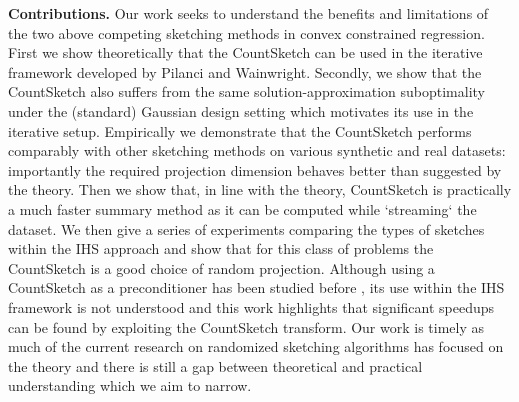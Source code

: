 \textbf{Contributions.}
Our work seeks to understand the benefits and limitations of the two
above competing sketching methods in convex constrained regression.
First we show theoretically that the CountSketch can be used in the iterative
framework developed by Pilanci and Wainwright.
Secondly, we show that the CountSketch also suffers from the same
 solution-approximation
suboptimality under the (standard) Gaussian design setting which motivates its
use in the iterative setup.
Empirically we demonstrate that the CountSketch performs comparably with
other sketching methods on various synthetic and real datasets:
importantly the required projection dimension behaves better than suggested by
the theory.
Then we show that, in line with the theory, CountSketch is practically a much
faster summary method as it can be computed while `streaming` the dataset.
We then give a series of experiments comparing the types of sketches within the
IHS approach and show that for this class of problems the CountSketch is a good
choice of random projection.
Although using a CountSketch as a preconditioner has been studied before
\cite{dahiya2018empirical}, its use
within the IHS framework is not understood and this work highlights that
significant
speedups can be found by exploiting the CountSketch transform.
Our work is timely as much of the current research on randomized sketching
 algorithms
has focused on the theory and there is still a gap between theoretical and
practical understanding which we aim to narrow.
